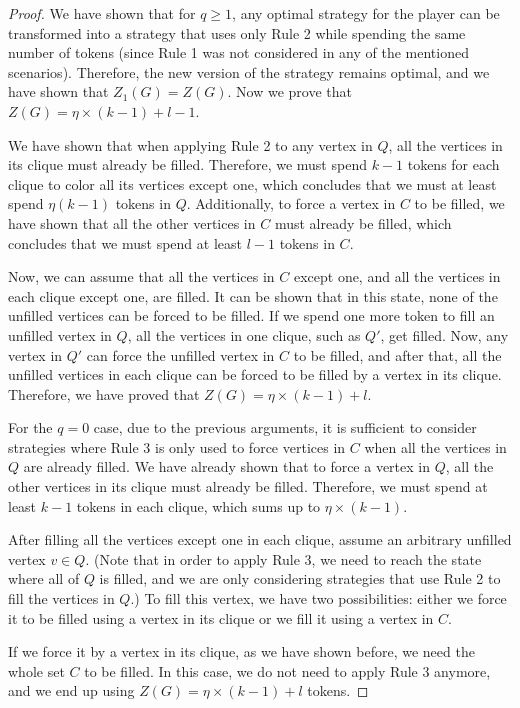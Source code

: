 \documentclass[11pt]{article}
\theoremstyle{plain}
\theoremstyle{definition}
\theoremstyle{remark}
\begin{document}
\begin{proof}
    We have shown that for $q \geq 1$, any optimal strategy for the player can be transformed into a strategy that uses only Rule 2 while spending the same number of tokens (since Rule 1 was not considered in any of the mentioned scenarios). Therefore, the new version of the strategy remains optimal, and we have shown that $Z_1(G) = Z(G)$. Now we prove that $Z(G) = \eta \times (k-1) + l - 1$.

    We have shown that when applying Rule 2 to any vertex in $Q$, all the vertices in its clique must already be filled. Therefore, we must spend $k-1$ tokens for each clique to color all its vertices except one, which concludes that we must at least spend $\eta(k-1)$ tokens in $Q$. Additionally, to force a vertex in $C$ to be filled, we have shown that all the other vertices in $C$ must already be filled, which concludes that we must spend at least $l-1$ tokens in $C$. 
    
    Now, we can assume that all the vertices in $C$ except one, and all the vertices in each clique except one, are filled. It can be shown that in this state, none of the unfilled vertices can be forced to be filled. If we spend one more token to fill an unfilled vertex in $Q$, all the vertices in one clique, such as $Q'$, get filled. Now, any vertex in $Q'$ can force the unfilled vertex in $C$ to be filled, and after that, all the unfilled vertices in each clique can be forced to be filled by a vertex in its clique. Therefore, we have proved that $Z(G) = \eta \times (k-1) + l$.
    
    For the $q = 0$ case, due to the previous arguments, it is sufficient to consider strategies where Rule 3 is only used to force vertices in $C$ when all the vertices in $Q$ are already filled. We have already shown that to force a vertex in $Q$, all the other vertices in its clique must already be filled. Therefore, we must spend at least $k-1$ tokens in each clique, which sums up to $\eta \times (k-1)$.
    
    After filling all the vertices except one in each clique, assume an arbitrary unfilled vertex $v \in Q$. (Note that in order to apply Rule 3, we need to reach the state where all of $Q$ is filled, and we are only considering strategies that use Rule 2 to fill the vertices in $Q$.) To fill this vertex, we have two possibilities: either we force it to be filled using a vertex in its clique or we fill it using a vertex in $C$. 
    
    If we force it by a vertex in its clique, as we have shown before, we need the whole set $C$ to be filled. In this case, we do not need to apply Rule 3 anymore, and we end up using $Z(G) = \eta \times (k-1) + l$ tokens.
    

\end{proof}
\end{document}
